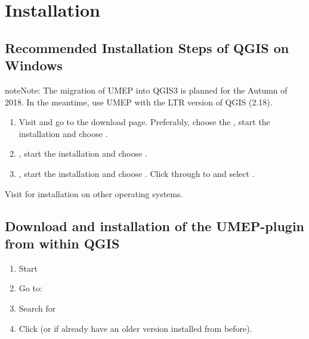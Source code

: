 \documentclass[letterpaper,10pt,english]{sphinxmanual}
\begin{document}
\section{Installation}
\label{\detokenize{Getting_Started:installation}}

\subsection{Recommended Installation Steps of QGIS on Windows}
\label{\detokenize{Getting_Started:recommended-installation-steps-of-qgis-on-windows}}
\begin{sphinxadmonition}{note}{Note:}
The migration of UMEP into QGIS3 is planned for the Autumn of 2018. In the meantime, use UMEP with the LTR version of QGIS (2.18).
\end{sphinxadmonition}
\begin{enumerate}
\item {} 
Visit  and go to the download page. Preferably, choose the , start the installation and choose .

\item {} 
, start the installation and choose .

\item {} 
 {\hyperref[\detokenize{Abbreviations::doc}]{}}, start the installation and choose . Click through to  and select .

\end{enumerate}

Visit  for installation on other operating systems.


\subsection{Download and installation of the UMEP-plugin from within QGIS}
\label{\detokenize{Getting_Started:download-and-installation-of-the-umep-plugin-from-within-qgis}}
\begin{enumerate}
\item {} 
Start 

\item {} 
Go to: 

\item {} 
Search for 

\item {} 
Click  (or  if already have an older version installed from before).

\end{enumerate}
\end{document}

